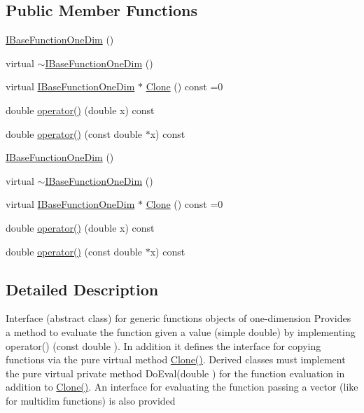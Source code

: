 \subsection*{Public Member Functions}
\begin{DoxyCompactItemize}
\item 
\mbox{\hyperlink{classROOT_1_1Math_1_1IBaseFunctionOneDim_a52ca1f6207a3360d1bb00de0def69c3e}{I\+Base\+Function\+One\+Dim}} ()
\item 
virtual \mbox{\hyperlink{classROOT_1_1Math_1_1IBaseFunctionOneDim_a475922c2b1288b843d7bc7fae17b6ae2}{$\sim$\+I\+Base\+Function\+One\+Dim}} ()
\item 
virtual \mbox{\hyperlink{classROOT_1_1Math_1_1IBaseFunctionOneDim}{I\+Base\+Function\+One\+Dim}} $\ast$ \mbox{\hyperlink{classROOT_1_1Math_1_1IBaseFunctionOneDim_a656dbb4dfc43e8d1566442bfb1a717fd}{Clone}} () const =0
\item 
double \mbox{\hyperlink{classROOT_1_1Math_1_1IBaseFunctionOneDim_ac7f3be3ec5ab92d04ebb33f6615d59c2}{operator()}} (double x) const
\item 
double \mbox{\hyperlink{classROOT_1_1Math_1_1IBaseFunctionOneDim_ab99decfcf98d9b016322ebe85f4bc77a}{operator()}} (const double $\ast$x) const
\item 
\mbox{\hyperlink{classROOT_1_1Math_1_1IBaseFunctionOneDim_a52ca1f6207a3360d1bb00de0def69c3e}{I\+Base\+Function\+One\+Dim}} ()
\item 
virtual \mbox{\hyperlink{classROOT_1_1Math_1_1IBaseFunctionOneDim_a475922c2b1288b843d7bc7fae17b6ae2}{$\sim$\+I\+Base\+Function\+One\+Dim}} ()
\item 
virtual \mbox{\hyperlink{classROOT_1_1Math_1_1IBaseFunctionOneDim}{I\+Base\+Function\+One\+Dim}} $\ast$ \mbox{\hyperlink{classROOT_1_1Math_1_1IBaseFunctionOneDim_a656dbb4dfc43e8d1566442bfb1a717fd}{Clone}} () const =0
\item 
double \mbox{\hyperlink{classROOT_1_1Math_1_1IBaseFunctionOneDim_ac7f3be3ec5ab92d04ebb33f6615d59c2}{operator()}} (double x) const
\item 
double \mbox{\hyperlink{classROOT_1_1Math_1_1IBaseFunctionOneDim_ab99decfcf98d9b016322ebe85f4bc77a}{operator()}} (const double $\ast$x) const
\end{DoxyCompactItemize}


\subsection{Detailed Description}
Interface (abstract class) for generic functions objects of one-\/dimension Provides a method to evaluate the function given a value (simple double) by implementing operator() (const double ). In addition it defines the interface for copying functions via the pure virtual method \mbox{\hyperlink{classROOT_1_1Math_1_1IBaseFunctionOneDim_a656dbb4dfc43e8d1566442bfb1a717fd}{Clone()}}. Derived classes must implement the pure virtual private method Do\+Eval(double ) for the function evaluation in addition to \mbox{\hyperlink{classROOT_1_1Math_1_1IBaseFunctionOneDim_a656dbb4dfc43e8d1566442bfb1a717fd}{Clone()}}. An interface for evaluating the function passing a vector (like for multidim functions) is also provided 


